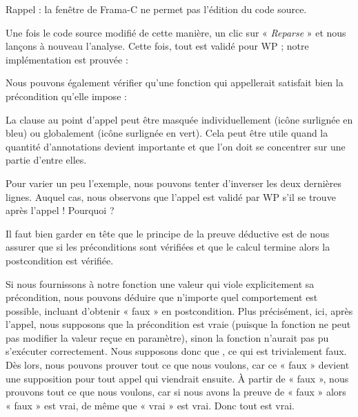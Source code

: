 \begin{Warning}
Rappel : la fenêtre de Frama-C ne permet pas l'édition du code source.
\end{Warning}


Une fois le code source modifié de cette manière, un clic sur « \textit{Reparse} » et
nous lançons à nouveau l'analyse. Cette fois, tout est validé pour WP ; notre
implémentation est prouvée :





Nous pouvons également vérifier qu'une fonction qui appellerait 
satisfait bien la précondition qu'elle impose :








La clause  au point d'appel peut être masquée
individuellement (icône surlignée en bleu) ou globalement (icône surlignée en
vert). Cela peut être utile quand la quantité d'annotations devient importante
et que l'on doit se concentrer sur une partie d'entre elles.


Pour varier un peu l'exemple, nous pouvons tenter d'inverser les deux
dernières lignes. Auquel cas, nous observons que l'appel 
est validé par WP s'il se trouve après l'appel  !
Pourquoi ?



Il faut bien garder en tête que le principe de la preuve déductive est de nous
assurer que si les préconditions sont vérifiées et que le calcul termine alors
la postcondition est vérifiée.


Si nous fournissons à notre fonction une valeur qui viole explicitement sa
précondition, nous pouvons déduire que n'importe quel comportement est possible,
incluant d'obtenir « faux » en postcondition. Plus précisément, ici, après
l'appel, nous supposons que la précondition est vraie (puisque la fonction ne
peut pas modifier la valeur reçue en paramètre), sinon la fonction n'aurait pas
pu s'exécuter correctement. Nous supposons donc que
, ce qui est trivialement faux. Dès lors,
nous pouvons  prouver tout ce que nous voulons, car ce « faux » devient une
supposition pour tout appel qui viendrait ensuite. À partir de « faux », nous
prouvons tout ce que
nous voulons, car si nous avons la preuve de « faux » alors « faux » est vrai,
de même que « vrai » est vrai. Donc tout est vrai.



